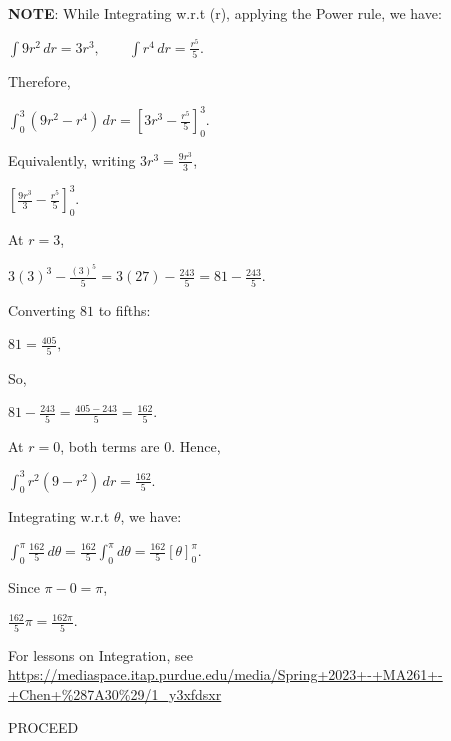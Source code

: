 \documentclass[a4paper, 10pt, onepage]{elegantbook}
\begin{document}
\textbf{NOTE}: While Integrating w.r.t (r), applying the Power rule, we have:

$
\int 9r^2\,dr=3r^3,\qquad \int r^4\,dr=\frac{r^5}{5}.
$

\noindent

Therefore,

$
\int_{0}^{3}(9r^2-r^4)\,dr
=
\left[3r^3-\frac{r^5}{5}\right]_{0}^{3}.
$

\noindent

Equivalently, writing $3r^3=\frac{9r^3}{3}$,

$
\left[\frac{9r^3}{3}-\frac{r^5}{5}\right]_{0}^{3}.
$

\noindent

At $r=3$,

$
3(3)^3-\frac{(3)^5}{5}
=
3(27)-\frac{243}{5}
=
81-\frac{243}{5}.
$

\noindent

Converting $81$ to fifths:

$
81=\frac{405}{5},
$

\noindent

So,

$
81-\frac{243}{5}
=
\frac{405-243}{5}
=
\frac{162}{5}.
$

\noindent

At $r=0$, both terms are $0$. Hence,

$
\int_{0}^{3}r^2(9-r^2)\,dr=\frac{162}{5}.
$

\noindent

Integrating  w.r.t $\theta$, we have: 

$
\int_{0}^{\pi}\frac{162}{5}\,d\theta
=
\frac{162}{5}\int_{0}^{\pi}d\theta
=
\frac{162}{5}[\theta]_{0}^{\pi}.
$

\noindent

Since $\pi-0=\pi$,

$
\frac{162}{5}\pi
=
\boxed{\frac{162\pi}{5}}.
$
 
\noindent

For lessons on Integration, see 
\url{https://mediaspace.itap.purdue.edu/media/Spring+2023+-+MA261+-+Chen+%287A30%29/1_y3xfdsxr}

\medskip

PROCEED

\end{document}
